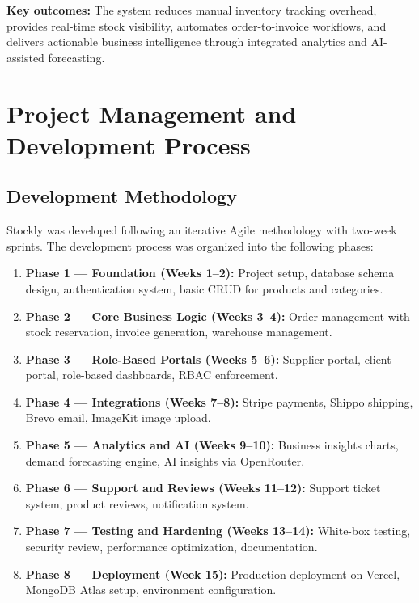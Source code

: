 \documentclass[12pt,a4paper]{report}
\begin{document}
\textbf{Key outcomes:} The system reduces manual inventory tracking overhead, provides real-time stock visibility, automates order-to-invoice workflows, and delivers actionable business intelligence through integrated analytics and AI-assisted forecasting.

\newpage

\tableofcontents
\newpage


\chapter{Project Management and Development Process}
\section{Development Methodology}

Stockly was developed following an iterative Agile methodology with two-week sprints. The development process was organized into the following phases:

\begin{enumerate}[leftmargin=1.5em]
  \item \textbf{Phase 1 --- Foundation (Weeks 1--2):} Project setup, database schema design, authentication system, basic CRUD for products and categories.
  \item \textbf{Phase 2 --- Core Business Logic (Weeks 3--4):} Order management with stock reservation, invoice generation, warehouse management.
  \item \textbf{Phase 3 --- Role-Based Portals (Weeks 5--6):} Supplier portal, client portal, role-based dashboards, RBAC enforcement.
  \item \textbf{Phase 4 --- Integrations (Weeks 7--8):} Stripe payments, Shippo shipping, Brevo email, ImageKit image upload.
  \item \textbf{Phase 5 --- Analytics and AI (Weeks 9--10):} Business insights charts, demand forecasting engine, AI insights via OpenRouter.
  \item \textbf{Phase 6 --- Support and Reviews (Weeks 11--12):} Support ticket system, product reviews, notification system.
  \item \textbf{Phase 7 --- Testing and Hardening (Weeks 13--14):} White-box testing, security review, performance optimization, documentation.
  \item \textbf{Phase 8 --- Deployment (Week 15):} Production deployment on Vercel, MongoDB Atlas setup, environment configuration.
\end{enumerate}
\end{document}

